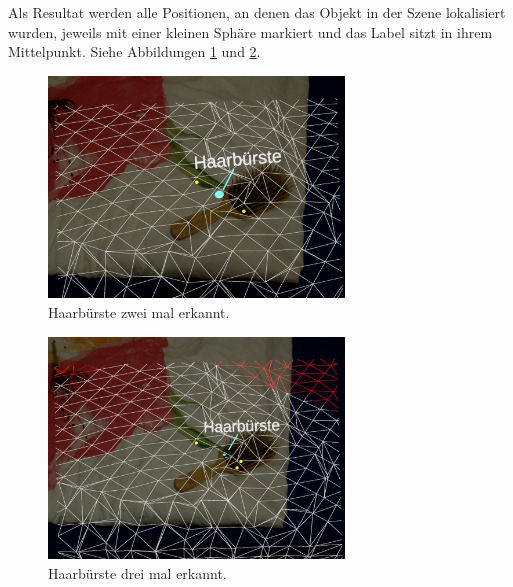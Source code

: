 Als Resultat werden alle Positionen, an denen das Objekt in der Szene lokalisiert wurden, jeweils mit einer kleinen Sphäre markiert und das Label sitzt in ihrem Mittelpunkt. Siehe Abbildungen \ref{image:multi1} und \ref{image:multi2}.


\begin{figure}[H]
	\centering
	\includegraphics[width=0.7\textwidth]{images/ML_multi1.jpg}
	\caption[Haarbürste zwei mal erkannt]{Haarbürste zwei mal erkannt.}
	\label{image:multi1}
\end{figure}


\begin{figure}[H]
	\centering
	\includegraphics[width=0.7\textwidth]{images/ML_multi2.jpg}
	\caption[Haarbürste drei mal erkannt]{Haarbürste drei mal erkannt.}
	\label{image:multi2}
\end{figure}


